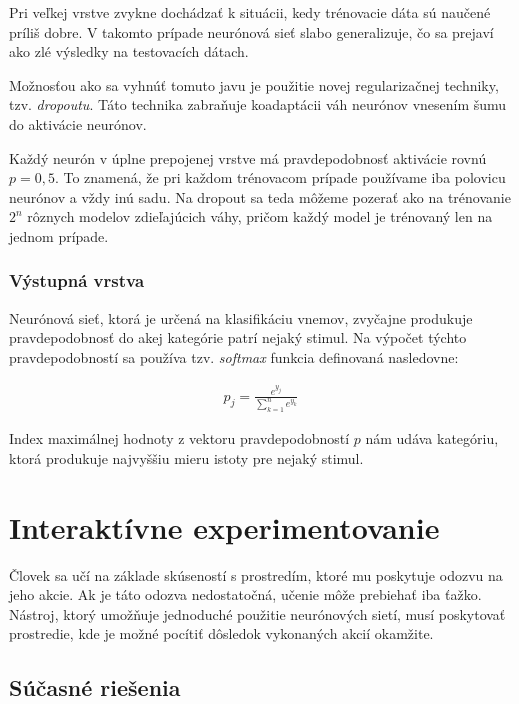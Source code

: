Pri veľkej vrstve zvykne dochádzať k situácii, kedy trénovacie dáta sú naučené príliš dobre. V takomto prípade neurónová sieť slabo generalizuje, čo sa prejaví ako zlé výsledky na testovacích dátach.

Možnosťou ako sa vyhnúť tomuto javu je použitie novej regularizačnej techniky, tzv. \emph{dropoutu}\autocite{Hinton2012}. Táto technika zabraňuje koadaptácii váh neurónov vnesením šumu do aktivácie neurónov.

Každý neurón v úplne prepojenej vrstve má pravdepodobnosť aktivácie rovnú ${p=0{,}5}$. To znamená, že pri každom trénovacom prípade používame iba polovicu neurónov a vždy inú sadu. Na dropout sa teda môžeme pozerať ako na trénovanie $2^n$ rôznych modelov zdieľajúcich váhy, pričom každý model je trénovaný len na jednom prípade.

\subsection{Výstupná vrstva} 

Neurónová sieť, ktorá je určená na klasifikáciu vnemov, zvyčajne produkuje pravdepodobnosť do akej kategórie patrí nejaký stimul. Na výpočet týchto pravdepodobností sa používa tzv. \emph{softmax} funkcia definovaná nasledovne:

\begin{eqnarray}
p_j = \frac{e^{y_j}}{\sum\limits_{k=1}^n e^{y_k}}
\end{eqnarray}

Index maximálnej hodnoty z vektoru pravdepodobností $p$ nám udáva kategóriu, ktorá produkuje najvyššiu mieru istoty pre nejaký stimul.


\chapter{Interaktívne experimentovanie}

Človek sa učí na základe skúseností s prostredím, ktoré mu poskytuje odozvu na jeho akcie. Ak je táto odozva nedostatočná, učenie môže prebiehať iba ťažko. Nástroj, ktorý umožňuje jednoduché použitie neurónových sietí, musí poskytovať prostredie, kde je možné pocítiť dôsledok vykonaných akcií okamžite.

\section{Súčasné riešenia}

